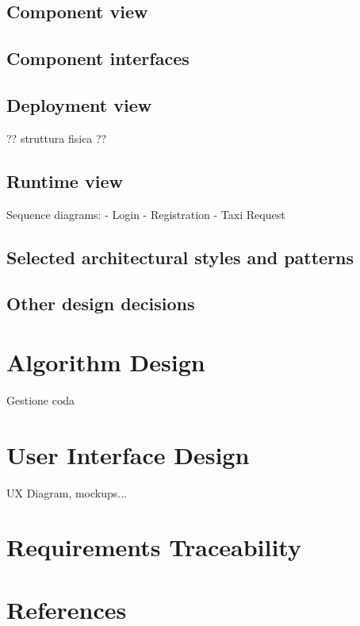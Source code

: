 \documentclass[12pt, a4paper]{article}
\begin{document}
        \subsection{Component view}
    	
    	\subsection{Component interfaces}
    	
    	\subsection{Deployment view}
    	?? struttura fisica ??
    	
    	\subsection{Runtime view}
    	Sequence diagrams:
    	- Login
    	- Registration
    	- Taxi Request
    	
    	
    	\subsection{Selected architectural styles and patterns}
    	
    	\subsection{Other design decisions}
    	
    \newpage	    
    \section{Algorithm Design}
        Gestione coda
    
    \newpage
    \section{User Interface Design}
        UX Diagram, mockups...
        
    \newpage
    \section{Requirements Traceability}
        
    \newpage
    \section{References}
\end{document}
